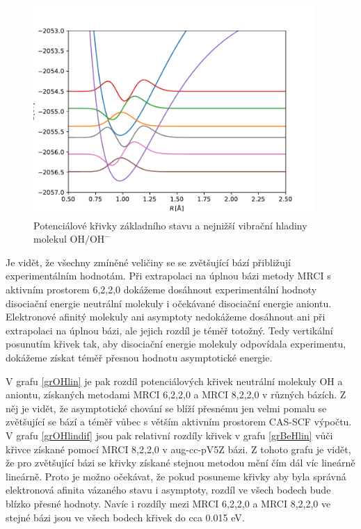 \begin{figure}
\centering
\includegraphics[width=0.95\textwidth]{../img/OH-vibr1.pdf}
\caption{Potenciálové křivky základního stavu a nejnižší vibrační hladiny molekul $\mathrm{OH/OH^-}$ \label{VibrOH1}}
\end{figure}



Je vidět, že všechny zmíněné veličiny se se zvětšující bází přibližují experimentálním 
hodnotám. Při extrapolaci na úplnou bázi metody MRCI s aktivním prostorem 6,2,2,0 
dokážeme dosáhnout experimentální hodnoty disociační energie neutrální molekuly i 
očekávané disociační energie aniontu. Elektronové afinitý molekuly ani asymptoty 
nedokážeme dosáhnout ani při extrapolaci na úplnou bázi, ale jejich rozdíl je téměř 
totožný. Tedy vertikální posunutím křivek tak, aby disociační energie molekuly 
odpovídala experimentu, dokážeme získat téměř přesnou hodnotu asymptotické energie. 
 
V grafu \ref{grOHlin} je pak rozdíl potenciálových křivek neutrální molekuly OH a 
aniontu, získaných metodami MRCI 6,2,2,0 a MRCI 8,2,2,0 v různých bázích. Z něj je 
vidět, že asymptotické chování se blíží přesnému jen velmi pomalu se 
zvětšující se bází a téměř vůbec s větším aktivním prostorem CAS-SCF výpočtu.
V grafu \ref{grOHlindif} jsou pak relativní rozdíly křivek v grafu \ref{grBeHlin} vůči 
křivce získané pomocí MRCI 8,2,2,0 v aug-cc-pV5Z bázi. Z tohoto grafu je vidět, že pro 
zvětšující bázi se křivky získané stejnou metodou mění čím dál víc lineárně lineárně. 
Proto je možno očekávat, že pokud posuneme křivky aby byla správná elektronová 
afinita vázaného stavu i asymptoty, rozdíl ve všech bodech bude blízko přesné 
hodnoty. Navíc i rozdíly mezi MRCI 6,2,2,0 a MRCI 8,2,2,0 ve stejné bázi
 jsou ve všech bodech křivek do cca 0.015 eV.

